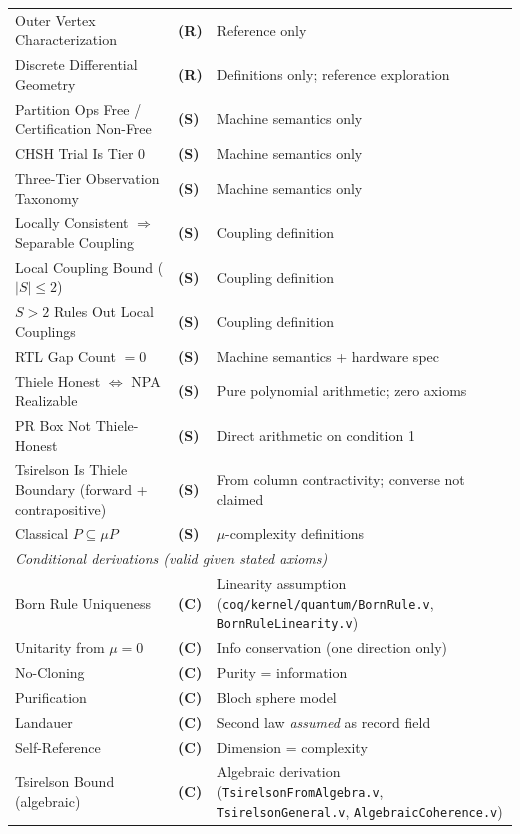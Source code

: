 \documentclass[11pt, a4paper]{report}
\theoremstyle{definition}
\theoremstyle{plain}
\begin{document}
\begin{center}
\begin{tabular}{lll}
Outer Vertex Characterization & \textbf{(R)} & Reference only \\
Discrete Differential Geometry & \textbf{(R)} & Definitions only; reference exploration \\
Partition Ops Free / Certification Non-Free & \textbf{(S)} & Machine semantics only \\
CHSH Trial Is Tier 0 & \textbf{(S)} & Machine semantics only \\
Three-Tier Observation Taxonomy & \textbf{(S)} & Machine semantics only \\
Locally Consistent $\Rightarrow$ Separable Coupling & \textbf{(S)} & Coupling definition \\
Local Coupling Bound ($|S| \le 2$) & \textbf{(S)} & Coupling definition \\
$S > 2$ Rules Out Local Couplings & \textbf{(S)} & Coupling definition \\
RTL Gap Count $= 0$ & \textbf{(S)} & Machine semantics + hardware spec \\
Thiele Honest $\iff$ NPA Realizable & \textbf{(S)} & Pure polynomial arithmetic; zero axioms \\
PR Box Not Thiele-Honest & \textbf{(S)} & Direct arithmetic on condition 1 \\
Tsirelson Is Thiele Boundary (forward + contrapositive) & \textbf{(S)} & From column contractivity; converse not claimed \\
Classical $P \subseteq \mu P$ & \textbf{(S)} & $\mu$-complexity definitions \\
\hline
\multicolumn{3}{l}{\emph{Conditional derivations (valid given stated axioms)}} \\
\hline
Born Rule Uniqueness & \textbf{(C)} & Linearity assumption (\texttt{coq/kernel/quantum/BornRule.v}, \texttt{BornRuleLinearity.v}) \\
Unitarity from $\mu=0$ & \textbf{(C)} & Info conservation (one direction only) \\
No-Cloning & \textbf{(C)} & Purity = information \\
Purification & \textbf{(C)} & Bloch sphere model \\
Landauer & \textbf{(C)} & Second law \emph{assumed} as record field \\
Self-Reference & \textbf{(C)} & Dimension = complexity \\
Tsirelson Bound (algebraic) & \textbf{(C)} & Algebraic derivation (\texttt{TsirelsonFromAlgebra.v}, \texttt{TsirelsonGeneral.v}, \texttt{AlgebraicCoherence.v}) \\

\end{tabular}
\end{center}
\end{document}
